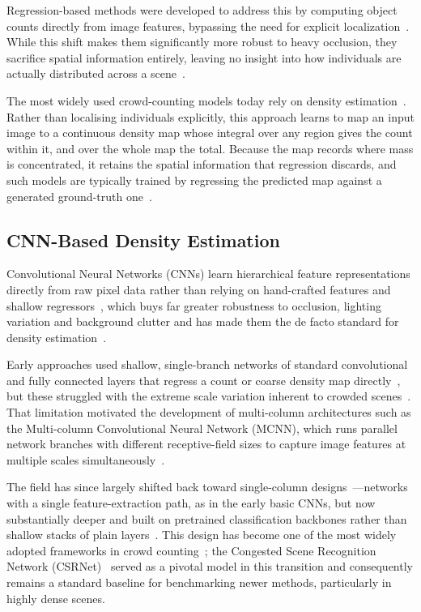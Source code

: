 \documentclass[conference]{IEEEtran}
\begin{document}
Regression-based methods were developed to address this by computing object counts directly from image features, bypassing the need for explicit localization~\cite{chan2008privacy, idrees2013multi, gao2020crowdcountingsurvey}. While this shift makes them significantly more robust to heavy occlusion, they sacrifice spatial information entirely, leaving no insight into how individuals are actually distributed across a scene~\cite{gao2020crowdcountingsurvey}.

The most widely used crowd-counting models today rely on density estimation~\cite{lempitsky2010learning, gao2020crowdcountingsurvey}. Rather than localising individuals explicitly, this approach learns to map an input image to a continuous density map whose integral over any region gives the count within it, and over the whole map the total. Because the map records where mass is concentrated, it retains the spatial information that regression discards, and such models are typically trained by regressing the predicted map against a generated ground-truth one~\cite{wang2020mobilecount, li2018csrnet, gao2020crowdcountingsurvey}.

\subsection{CNN-Based Density Estimation}

Convolutional Neural Networks (CNNs) learn hierarchical feature representations directly from raw pixel data rather than relying on hand-crafted features and shallow regressors~\cite{krizhevsky2012imagenet}, which buys far greater robustness to occlusion, lighting variation and background clutter and has made them the de facto standard for density estimation~\cite{gao2020crowdcountingsurvey, li2018csrnet}.

Early approaches used shallow, single-branch networks of standard convolutional and fully connected layers that regress a count or coarse density map directly~\cite{fu2015fast, wang2015deep}, but these struggled with the extreme scale variation inherent to crowded scenes~\cite{Zhang_2016_CVPR, gao2020crowdcountingsurvey}. That limitation motivated the development of multi-column architectures such as the Multi-column Convolutional Neural Network (MCNN), which runs parallel network branches with different receptive-field sizes to capture image features at multiple scales simultaneously~\cite{Zhang_2016_CVPR}.

The field has since largely shifted back toward single-column designs~\cite{gao2020crowdcountingsurvey}---networks with a single feature-extraction path, as in the early basic CNNs, but now substantially deeper and built on pretrained classification backbones rather than shallow stacks of plain layers~\cite{li2018csrnet, gao2020crowdcountingsurvey}. This design has become one of the most widely adopted frameworks in crowd counting~\cite{gao2020crowdcountingsurvey}; the Congested Scene Recognition Network (CSRNet)~\cite{li2018csrnet} served as a pivotal model in this transition and consequently remains a standard baseline for benchmarking newer methods, particularly in highly dense scenes.
\end{document}
